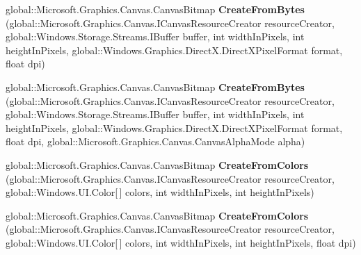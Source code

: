 \begin{DoxyCompactItemize}
\item 
\mbox{\label{interface_microsoft_1_1_graphics_1_1_canvas_1_1_i_canvas_bitmap_statics_adb5ff0876be4f23ff9d89e426b69dc40}} 
global\+::\+Microsoft.\+Graphics.\+Canvas.\+Canvas\+Bitmap {\bfseries Create\+From\+Bytes} (global\+::\+Microsoft.\+Graphics.\+Canvas.\+I\+Canvas\+Resource\+Creator resource\+Creator, global\+::\+Windows.\+Storage.\+Streams.\+I\+Buffer buffer, int width\+In\+Pixels, int height\+In\+Pixels, global\+::\+Windows.\+Graphics.\+Direct\+X.\+Direct\+X\+Pixel\+Format format, float dpi)
\item 
\mbox{\label{interface_microsoft_1_1_graphics_1_1_canvas_1_1_i_canvas_bitmap_statics_af25c039901e5434562d3561a03d9c70e}} 
global\+::\+Microsoft.\+Graphics.\+Canvas.\+Canvas\+Bitmap {\bfseries Create\+From\+Bytes} (global\+::\+Microsoft.\+Graphics.\+Canvas.\+I\+Canvas\+Resource\+Creator resource\+Creator, global\+::\+Windows.\+Storage.\+Streams.\+I\+Buffer buffer, int width\+In\+Pixels, int height\+In\+Pixels, global\+::\+Windows.\+Graphics.\+Direct\+X.\+Direct\+X\+Pixel\+Format format, float dpi, global\+::\+Microsoft.\+Graphics.\+Canvas.\+Canvas\+Alpha\+Mode alpha)
\item 
\mbox{\label{interface_microsoft_1_1_graphics_1_1_canvas_1_1_i_canvas_bitmap_statics_a1cfb06ccc30d0a9f7834cca04f8ae82a}} 
global\+::\+Microsoft.\+Graphics.\+Canvas.\+Canvas\+Bitmap {\bfseries Create\+From\+Colors} (global\+::\+Microsoft.\+Graphics.\+Canvas.\+I\+Canvas\+Resource\+Creator resource\+Creator, global\+::\+Windows.\+U\+I.\+Color\mbox{[}$\,$\mbox{]} colors, int width\+In\+Pixels, int height\+In\+Pixels)
\item 
\mbox{\label{interface_microsoft_1_1_graphics_1_1_canvas_1_1_i_canvas_bitmap_statics_ae74df061d7bb261f4852784d512cb06a}} 
global\+::\+Microsoft.\+Graphics.\+Canvas.\+Canvas\+Bitmap {\bfseries Create\+From\+Colors} (global\+::\+Microsoft.\+Graphics.\+Canvas.\+I\+Canvas\+Resource\+Creator resource\+Creator, global\+::\+Windows.\+U\+I.\+Color\mbox{[}$\,$\mbox{]} colors, int width\+In\+Pixels, int height\+In\+Pixels, float dpi)
\item 

\end{DoxyCompactItemize}
